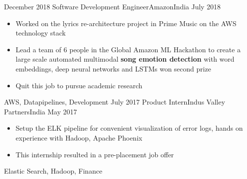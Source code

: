 %
%
%
\begin{experiences}
  \experience
    {December 2018}     {Software Development Engineer}{Amazon}{India}
    {July 2018}    {
                      \begin{itemize}
                        \item Worked on the lyrics re-architecture project in Prime Music on the AWS technology stack
                        \item Lead a team of 6 people in the Global Amazon ML Hackathon to create a large scale automated multimodal \textbf{song emotion detection} with word embeddings, deep neural networks and LSTMs won second prize
                        \item Quit this job to pursue academic research
                      \end{itemize}
                    }
                    {AWS, Datapipelines, Development}
  \emptySeparator
  \experience
    {July 2017}     {Product Intern}{Indus Valley Partners}{India}
    {May 2017}    {
                      \begin{itemize}
                        \item Setup the ELK pipeline for convenient visualization of error logs, hands on experience with Hadoop, Apache Phoenix
                        \item This internship resulted in a pre-placement job offer               
                      \end{itemize}
                    }
                    {Elastic Search, Hadoop, Finance}
  \emptySeparator
\end{experiences}
